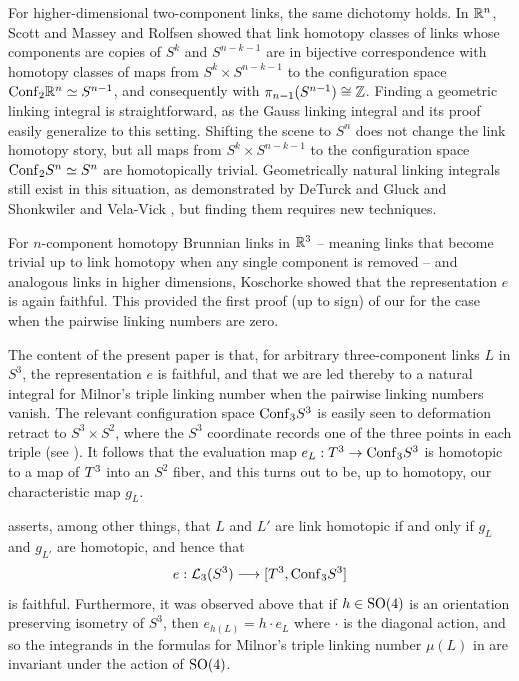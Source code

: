 {For higher-dimensional two-component links, the same dichotomy holds. 
In $\mathbb R^n$, Scott \cite{Scott} and Massey and Rolfsen \cite{MasseyRolfsen} showed that link homotopy classes of links whose components are copies of $S^k$ and $S^{n-k-1}$ are in bijective correspondence with homotopy classes of maps from $S^k\times S^{n-k-1}$ to the configuration space $\mathrm{Conf}_{2}\mathbb R^n\simeq S^{n-1}$, and consequently with $\pi_{n-1}(S^{n-1}) \cong\mathbb Z$.  Finding a geometric linking integral is straightforward, as the Gauss linking integral and its proof easily generalize to this setting.  Shifting the scene to $S^n$ does not change the link homotopy story, but all maps from $S^k\times S^{n-k-1}$ to the configuration space $\mathrm{Conf}_{2}S^n\simeq S^n$ are homotopically trivial.  Geometrically natural linking integrals still exist in this situation, as demonstrated by DeTurck and Gluck \cite{DeTurckGluckb} and Shonkwiler and Vela-Vick \cite{SVV}, but finding them requires new techniques. 


For $n$-component {\itb homotopy Brunnian} links in $\mathbb R^3$ -- meaning links that become trivial up to link homotopy when any single component is removed -- and analogous links in higher dimensions, Koschorke \cite{Koschorke} showed that the representation $e$ is again faithful.  This provided the first proof (up to sign) of our  for the case when the pairwise linking numbers are zero.

The content of the present paper is that, for arbitrary three-component links $L$ in $S^3$, the representation $e$ is faithful, and that we are led thereby to a natural integral for Milnor's triple linking number when the pairwise linking numbers vanish.  The relevant configuration space $\mathrm{Conf}_{3}S^3$ is easily seen to deformation retract to  $S^3 \times S^2$, where the $S^3$ coordinate records one of the three points in each triple (see ).  It follows that the evaluation map $e_L:T^3\to\mathrm{Conf}_{3}S^3$ is homotopic to a map of $T^3$ into an $S^2$ fiber, and this turns out to be, up to homotopy, our characteristic map $g_L$.

 asserts, among other things, that $L$ and $L'$ are link homotopic if and only if $g_L$ and $g_{L'}$ are homotopic, and hence that
$$
e:\mathcal L_3(S^3)\longrightarrow[T^3,\mathrm{Conf}_{3}S^3]
$$
is faithful.  Furthermore, it was observed above that if $h\in\mathrm{SO}(4)$ is an orientation preserving isometry of $S^3$, then $e_{h(L)} = h\cdot e_L$ where $\cdot$ is the diagonal action, and so the integrands in the formulas for Milnor's triple linking number $\mu(L)$ in  are invariant under the action of $\mathrm{SO}(4)$.


}
